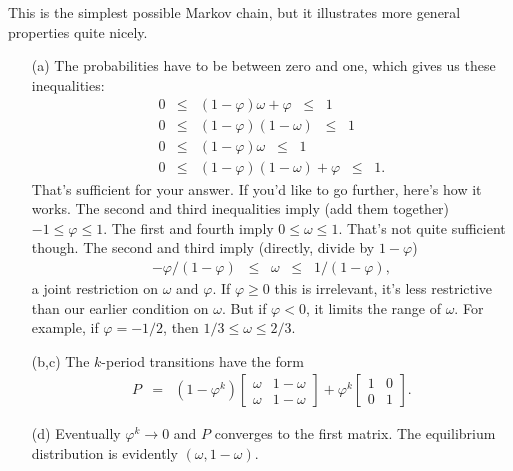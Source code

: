 \documentclass[11pt]{exam}
\begin{document}
\begin{questions}
\begin{solution}
This is the simplest possible Markov chain,
but it illustrates more general properties quite nicely.
\begin{enumerate}
\item [(a)] The probabilities have to be between zero and one,
which gives us these inequalities:
\begin{eqnarray*}
    0 &\leq& (1-\varphi) \omega + \varphi \;\;\leq\;\; 1 \\
    0 &\leq& (1-\varphi) (1-\omega) \;\;\leq\;\; 1 \\
    0 &\leq& (1-\varphi) \omega \;\;\leq\;\; 1 \\
    0 &\leq& (1-\varphi) (1-\omega) + \varphi \;\;\leq\;\; 1 .
\end{eqnarray*}
That's sufficient for your answer.
If you'd like to go further, here's how it works.
The second and third inequalities imply (add them together)
$ - 1 \leq \varphi \leq 1 $.
The first and fourth imply $ 0 \leq \omega \leq 1$.
That's not quite sufficient though.
The second and third imply (directly, divide by $1-\varphi$)
\begin{eqnarray*}
        - \varphi /(1-\varphi) \;\;\leq\;\; \omega \;\;\leq\;\; 1/(1-\varphi),
\end{eqnarray*}
a joint restriction on $\omega$ and $\varphi$.
If $\varphi \geq 0$ this is irrelevant,
it's less restrictive than our earlier condition on $\omega$.
But if $\varphi < 0$, it limits the range of $\omega$.
For example, if $\varphi = -1/2$,
then $ 1/3 \leq \omega \leq 2/3$.



\item [(b,c)] The $k$-period transitions have the form
\begin{eqnarray*}
    P &=& (1-\varphi^k)
        \left[
        \begin{array}{cc}
        \omega & 1-\omega \\ \omega & 1-\omega
        \end{array}
        \right]
        + \varphi^k
        \left[
        \begin{array}{cc}
        1  & 0  \\  0  & 1
        \end{array}
        \right] .
\end{eqnarray*}

\item [(d)]
Eventually $\varphi^k \rightarrow 0$ and $P$ converges to the
first matrix.
The equilibrium distribution is evidently $(\omega, 1-\omega)$.


\end{enumerate}
\end{solution}
\end{questions}
\end{document}
